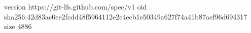 version https://git-lfs.github.com/spec/v1
oid sha256:42d83ac0ee2fcdd48f5964112e2e4ecb1e50349a627f74a41b87aef96d694317
size 4886
